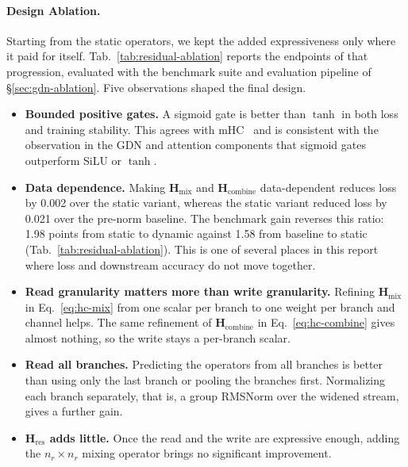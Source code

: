 \paragraph{Design Ablation.}
\label{sec:residual-ablation}
Starting from the static operators, we kept the added expressiveness only where
it paid for itself.
Tab.~\ref{tab:residual-ablation} reports the endpoints of that progression,
evaluated with the benchmark suite and evaluation pipeline of
\S\ref{sec:gdn-ablation}. Five observations shaped the final design.
\begin{itemize}[leftmargin=1.5em]
\item \textbf{Bounded positive gates.} A sigmoid gate is better than $\tanh$
  in both loss and training stability. This agrees with
  mHC~\citep{xie2025mhc} and is consistent with the observation in the GDN
  and attention components that sigmoid gates outperform SiLU or $\tanh$.
\item \textbf{Data dependence.} Making $\bm{H}_{\mathrm{mix}}$ and $\bm{H}_{\mathrm{combine}}$ data-dependent reduces loss by 0.002 over the static variant, whereas the static variant reduced loss by 0.021 over the pre-norm baseline. 
The benchmark gain reverses this ratio: 1.98 points from static to dynamic against 1.58 from baseline to static (Tab.~\ref{tab:residual-ablation}).  
This is one of several places in this report where loss and downstream accuracy do not move together.
\item \textbf{Read granularity matters more than write granularity.} Refining
  $\bm{H}_{\mathrm{mix}}$ in Eq.~\eqref{eq:hc-mix} from one scalar per branch
  to one weight per branch and channel helps. The same refinement of
  $\bm{H}_{\mathrm{combine}}$ in Eq.~\eqref{eq:hc-combine} gives almost
  nothing, so the write stays a per-branch scalar.
\item \textbf{Read all branches.} Predicting the operators from all branches
  is better than using only the last branch or pooling the branches first.
  Normalizing each branch separately, that is, a group RMSNorm over the
  widened stream, gives a further gain.
\item \textbf{$\bm{H}_{\mathrm{res}}$ adds little.} Once the read and the
  write are expressive enough, adding the $n_r\times n_r$ mixing operator
  brings no significant improvement.
\end{itemize}

